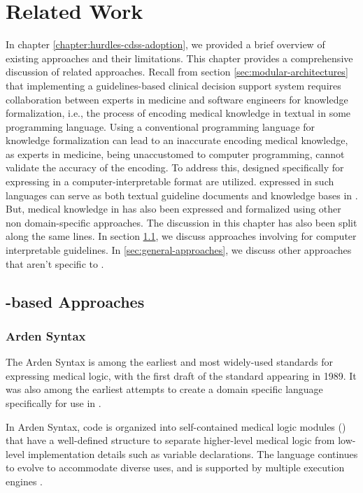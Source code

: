 \chapter{Related Work}

In chapter \ref{chapter:hurdles-cdss-adoption}, we provided a brief
overview of existing approaches and their limitations. This chapter
provides a comprehensive discussion of related approaches. Recall
from section \ref{sec:modular-architectures} that implementing a guidelines-based
clinical decision support system requires collaboration between
experts in medicine and software engineers for knowledge formalization, i.e.,
the process of encoding medical knowledge in textual
\BPGs{} in some programming language. Using a conventional programming
language for knowledge formalization can lead to an inaccurate
encoding medical knowledge, as experts in medicine, being unaccustomed
to computer programming, cannot validate the accuracy of the encoding.
To address this, \DSLs{} designed specifically for expressing
\BPGs{} in a computer-interpretable format are utilized. \BPGs{} expressed
in such languages can serve as both textual guideline documents and knowledge
bases in \CDSSs{}. But, medical knowledge in \BPGs{} has also been expressed
and formalized using other non domain-specific approaches. The discussion in
this chapter has also been split along the same lines. In section
\ref{sec:dsl-based-approaches}, we discuss approaches involving \DSLs{} for
computer interpretable guidelines. In \ref{sec:general-approaches}, we
discuss other approaches that aren't specific to \BPGs{}.

\section{\DSL{}-based Approaches}\label{sec:dsl-based-approaches}

\subsection{Arden Syntax}\label{sec:arden-syntax}

The Arden Syntax is among the earliest and most widely-used
standards for expressing medical logic, with the first
draft of the standard appearing in 1989.
It was also among the earliest attempts to create a domain
specific language specifically for use in \CDSSs{} \cite{SamwaldJBI12}.

In Arden Syntax, code is organized into self-contained medical
logic modules (\MLMs{}) that have a well-defined structure to
separate higher-level medical logic from low-level implementation
details such as variable declarations. The language continues to
evolve to accommodate diverse uses, and is supported by multiple execution
engines \cite{AnandMed04,KaradimasAMIA02}.

